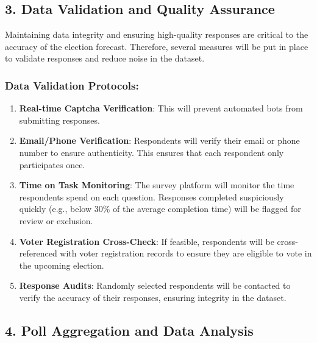 \documentclass[
  letterpaper,
  DIV=11,
  numbers=noendperiod]{scrartcl}
\providecommand{\tightlist}{%
  \setlength{\itemsep}{0pt}\setlength{\parskip}{0pt}}\usepackage{longtable,booktabs,array}
\begin{document}
\subsection{\texorpdfstring{\textbf{3. Data Validation and Quality
Assurance}}{3. Data Validation and Quality Assurance}}\label{data-validation-and-quality-assurance}

Maintaining data integrity and ensuring high-quality responses are
critical to the accuracy of the election forecast. Therefore, several
measures will be put in place to validate responses and reduce noise in
the dataset.

\subsubsection{\texorpdfstring{\textbf{Data Validation
Protocols}:}{Data Validation Protocols:}}\label{data-validation-protocols}

\begin{enumerate}
\def\labelenumi{\arabic{enumi}.}
\tightlist
\item
  \textbf{Real-time Captcha Verification}: This will prevent automated
  bots from submitting responses.
\item
  \textbf{Email/Phone Verification}: Respondents will verify their email
  or phone number to ensure authenticity. This ensures that each
  respondent only participates once.
\item
  \textbf{Time on Task Monitoring}: The survey platform will monitor the
  time respondents spend on each question. Responses completed
  suspiciously quickly (e.g., below 30\% of the average completion time)
  will be flagged for review or exclusion.
\item
  \textbf{Voter Registration Cross-Check}: If feasible, respondents will
  be cross-referenced with voter registration records to ensure they are
  eligible to vote in the upcoming election.
\item
  \textbf{Response Audits}: Randomly selected respondents will be
  contacted to verify the accuracy of their responses, ensuring
  integrity in the dataset.
\end{enumerate}

\subsection{\texorpdfstring{\textbf{4. Poll Aggregation and Data
Analysis}}{4. Poll Aggregation and Data Analysis}}\label{poll-aggregation-and-data-analysis}
\end{document}
